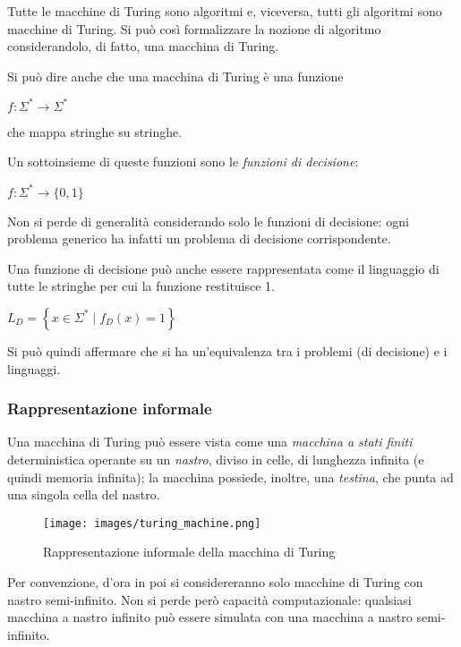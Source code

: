 Tutte le macchine di Turing sono algoritmi e, viceversa, tutti gli algoritmi sono macchine di Turing.
Si può così formalizzare la nozione di algoritmo considerandolo, di fatto, una macchina di Turing.

Si può dire anche che una macchina di Turing è una funzione
\begin{center}
    $f:  \Sigma^* \rightarrow \Sigma^*$
\end{center}
che mappa stringhe su stringhe.

Un sottoinsieme di queste funzioni sono le \textit{funzioni di decisione}:
\begin{center}
    $f: \Sigma^* \rightarrow \{ 0, 1 \}$
\end{center}
Non si perde di generalità considerando solo le funzioni di decisione: ogni problema generico ha infatti un problema di decisione corrispondente.

Una funzione di decisione  può anche essere rappresentata come il linguaggio di tutte le stringhe per cui la funzione restituisce 1.
\begin{center}
    $L_D = \left\{ x \in \Sigma^* \; | \; f_D (x) = 1 \right\}$
\end{center}
Si può quindi affermare che si ha un'equivalenza tra i problemi (di decisione) e i linguaggi.
\subsubsection*{Rappresentazione informale}
Una macchina di Turing può essere vista come una \textit{macchina a stati finiti} deterministica operante su un \textit{nastro}, diviso in celle, di lunghezza infinita (e quindi memoria infinita); la macchina possiede, inoltre, una \textit{testina}, che punta ad una singola cella del nastro.
\begin{figure}[h]
    \centering
    \texttt{[image: images/turing\_machine.png]}
    \caption{Rappresentazione informale della macchina di Turing}
    \label{fig:turing_machine}
\end{figure}

Per convenzione, d'ora in poi si considereranno solo macchine di Turing con nastro semi-infinito. Non si perde però capacità computazionale: qualsiasi macchina a nastro infinito può essere simulata con una macchina a nastro semi-infinito.

